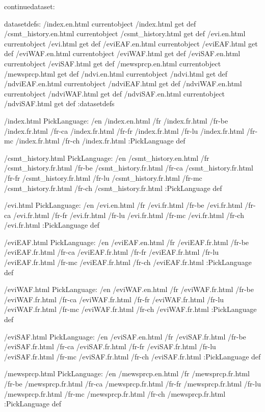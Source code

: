 \begin{ingrid}
continuedataset:

datasetdefs:
/index.en.html currentobject /index.html get def
/csmt_history.en.html currentobject /csmt_history.html get def
/evi.en.html currentobject /evi.html get def
/eviEAF.en.html currentobject /eviEAF.html get def
/eviWAF.en.html currentobject /eviWAF.html get def
/eviSAF.en.html currentobject /eviSAF.html get def
/mewsprcp.en.html currentobject /mewsprcp.html get def
/ndvi.en.html currentobject /ndvi.html get def
/ndviEAF.en.html currentobject /ndviEAF.html get def
/ndviWAF.en.html currentobject /ndviWAF.html get def
/ndviSAF.en.html currentobject /ndviSAF.html get def
:datasetdefs

/index.html {
PickLanguage:
/en /index.en.html
/fr /index.fr.html
/fr-be /index.fr.html
/fr-ca /index.fr.html
/fr-fr /index.fr.html
/fr-lu /index.fr.html
/fr-mc /index.fr.html
/fr-ch /index.fr.html
:PickLanguage
} def

/csmt_history.html {
PickLanguage:
/en /csmt_history.en.html
/fr /csmt_history.fr.html
/fr-be /csmt_history.fr.html
/fr-ca /csmt_history.fr.html
/fr-fr /csmt_history.fr.html
/fr-lu /csmt_history.fr.html
/fr-mc /csmt_history.fr.html
/fr-ch /csmt_history.fr.html
:PickLanguage
} def

/evi.html {
PickLanguage:
/en /evi.en.html
/fr /evi.fr.html
/fr-be /evi.fr.html
/fr-ca /evi.fr.html
/fr-fr /evi.fr.html
/fr-lu /evi.fr.html
/fr-mc /evi.fr.html
/fr-ch /evi.fr.html
:PickLanguage
} def

/eviEAF.html {
PickLanguage:
/en /eviEAF.en.html
/fr /eviEAF.fr.html
/fr-be /eviEAF.fr.html
/fr-ca /eviEAF.fr.html
/fr-fr /eviEAF.fr.html
/fr-lu /eviEAF.fr.html
/fr-mc /eviEAF.fr.html
/fr-ch /eviEAF.fr.html
:PickLanguage
} def

/eviWAF.html {
PickLanguage:
/en /eviWAF.en.html
/fr /eviWAF.fr.html
/fr-be /eviWAF.fr.html
/fr-ca /eviWAF.fr.html
/fr-fr /eviWAF.fr.html
/fr-lu /eviWAF.fr.html
/fr-mc /eviWAF.fr.html
/fr-ch /eviWAF.fr.html
:PickLanguage
} def

/eviSAF.html {
PickLanguage:
/en /eviSAF.en.html
/fr /eviSAF.fr.html
/fr-be /eviSAF.fr.html
/fr-ca /eviSAF.fr.html
/fr-fr /eviSAF.fr.html
/fr-lu /eviSAF.fr.html
/fr-mc /eviSAF.fr.html
/fr-ch /eviSAF.fr.html
:PickLanguage
} def

/mewsprcp.html {
PickLanguage:
/en /mewsprcp.en.html
/fr /mewsprcp.fr.html
/fr-be /mewsprcp.fr.html
/fr-ca /mewsprcp.fr.html
/fr-fr /mewsprcp.fr.html
/fr-lu /mewsprcp.fr.html
/fr-mc /mewsprcp.fr.html
/fr-ch /mewsprcp.fr.html
:PickLanguage
} def


\end{ingrid}
